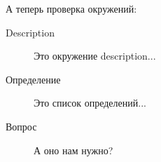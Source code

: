 \documentclass[14pt,final,titlepage]{hedsemwork}
\begin{document}
А теперь проверка окружений:
\begin{description}
    \item[Description] Это окружение description...
    \item[Определение] Это список определений...
    \item[Вопрос] А оно нам нужно?
\end{description}
\listoffigures
\end{document}
